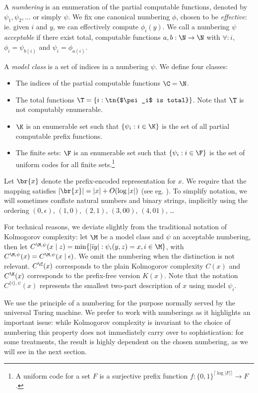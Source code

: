 A \emph{numbering} is an enumeration of the partial computable functions, denoted by $\psi_1, \psi_2, \ldots$ or simply $\psi$. We fix one canonical numbering $\phi$, chosen to be \emph{effective}: ie. given $i$ and $y$, we can effectively compute $\phi_i(y)$. We call a numbering $\psi$ \emph{acceptable} if there exist total, computable functions $a, b: \N \to \N$ with $\forall: i$, $\phi_i = \psi_{b(i)}$ and  $\psi_i = \phi_{a(i)}$.

A \emph{model class} is a set of indices in a numbering $\psi$. We define four classes:
\begin{itemize} 
  \item The indices of the partial computable functions $\C=\N$.
  \item The total functions $\T=\{i:\tn{$\psi_i$ is total}\}$. Note that $\T$ is not computably enumerable.
  \item $\K$ is an enumerable set such that $\{\psi_i:i\in\K\}$ is the set of all partial computable prefix functions.
  \item The finite sets: $\F$ is an enumerable set such that $\{\psi_i:i\in\F\}$ is the set of uniform codes for all finite sets.\footnote{A uniform code for a set $F$ is a surjective prefix function $f:\{0,1\}^{\lceil\log|F|\rceil}\to F$.}
\end{itemize}

Let $\br{x}$ denote the prefix-encoded representation for $x$. We require that the mapping satisfies $|\br{x}| = |x|+O(\log|x|)$ (see eg. \cite[Section~1.4]{li1993introduction}). To simplify notation, we will sometimes conflate natural numbers and binary strings, implicitly using the ordering $(0, \epsilon)$, $(1, 0)$, $(2, 1)$, $(3, 00)$, $(4, 01)$, \ldots  

For technical reasons, we deviate slightly from the traditional notation of Kolmogorov complexity: let $\M$ be a model class and $\psi$ an acceptable numbering, then let $C^{\M,\psi}(x\mid z)=\min\{|\bar\imath y|:\psi_i(y, z)=x,i\in\M\}$, with $C^{\M,\psi}(x) = C^{\M,\psi}(x\mid \epsilon)$. We omit the numbering when the distinction is not relevant. $C^\C(x)$ corresponds to the plain Kolmogorov complexity $C(x)$ and $C^\K(x)$ corresponds to the prefix-free version $K(x)$. Note that the notation $C^{\{i\}, \psi}(x)$ represents the smallest two-part description of $x$ using model $\psi_i$.

We use the principle of a numbering for the purpose normally served by the universal Turing machine. We prefer to work with numberings as it highlights an important issue: while Kolmogorov complexity is invariant to the choice of numbering this property does not immediately carry over to sophistication: for some treatments, the result is highly dependent on the chosen numbering, as we will see in the next section. 
 
